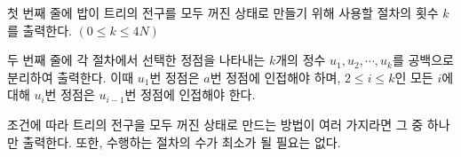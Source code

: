 첫 번째 줄에 밥이 트리의 전구를 모두 꺼진 상태로 만들기 위해 사용할 절차의 횟수 $k$를 출력한다. $(0 \le k \le 4N)$

두 번째 줄에 각 절차에서 선택한 정점을 나타내는 $k$개의 정수 $u_1,u_2,\cdots,u_k$를 공백으로 분리하여 출력한다. 이때 $u_1$번 정점은 $a$번 정점에 인접해야 하며, $2 \le i \le k$인 모든 $i$에 대해 $u_i$번 정점은 $u_{i-1}$번 정점에 인접해야 한다.

조건에 따라 트리의 전구을 모두 꺼진 상태로 만드는 방법이 여러 가지라면 그 중 하나만 출력한다. 또한, 수행하는 절차의 수가 최소가 될 필요는 없다.
